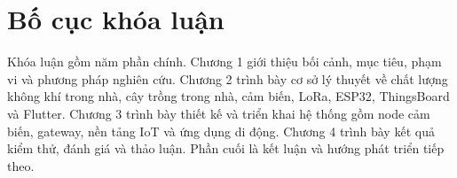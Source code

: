 \section{Bố cục khóa luận}
Khóa luận gồm năm phần chính. Chương 1 giới thiệu bối cảnh, mục tiêu, phạm vi và phương pháp nghiên cứu. Chương 2 trình bày cơ sở lý thuyết về chất lượng không khí trong nhà, cây trồng trong nhà, cảm biến, LoRa, ESP32, ThingsBoard và Flutter. Chương 3 trình bày thiết kế và triển khai hệ thống gồm node cảm biến, gateway, nền tảng IoT và ứng dụng di động. Chương 4 trình bày kết quả kiểm thử, đánh giá và thảo luận. Phần cuối là kết luận và hướng phát triển tiếp theo.
